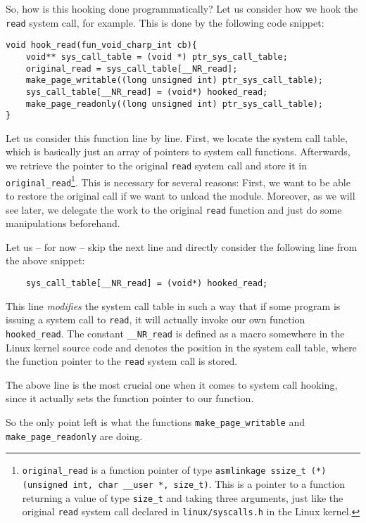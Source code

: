 \documentclass[10pt, letterpaper]{article}
\begin{document}
So, how is this hooking done programmatically? Let us consider how we hook the \texttt{read} system call, for example. This is done by the following code snippet:

\begin{verbatim}
void hook_read(fun_void_charp_int cb){
    void** sys_call_table = (void *) ptr_sys_call_table;
    original_read = sys_call_table[__NR_read];
    make_page_writable((long unsigned int) ptr_sys_call_table);
    sys_call_table[__NR_read] = (void*) hooked_read;
    make_page_readonly((long unsigned int) ptr_sys_call_table);
}
\end{verbatim}

Let us consider this function line by line. First, we locate the system call table, which is basically just an array of pointers to system call functions. Afterwards, we retrieve the pointer to the original \texttt{read} system call and store it in  \texttt{original\_read}\footnote{\texttt{original\_read} is a function pointer of type \texttt{asmlinkage ssize\_t (*)(unsigned int, char \_\_user *, size\_t)}. This is a pointer to a function returning a value of type \texttt{size\_t} and taking three arguments, just like the original \texttt{read} system call declared in \texttt{linux/syscalls.h} in the Linux kernel.}. This is necessary for several reasons: First, we want to be able to restore the original call if we want to unload the module. Moreover, as we will see later, we delegate the work to the original \texttt{read} function and just do some manipulations beforehand.

Let us -- for now -- skip the next line and directly consider the following line from the above snippet:

\begin{verbatim}
    sys_call_table[__NR_read] = (void*) hooked_read;
\end{verbatim}

This line \emph{modifies} the system call table in such a way that if some program is issuing a system call to \texttt{read}, it will actually invoke our own function \texttt{hooked\_read}. The constant \texttt{\_\_NR\_read} is defined as a macro somewhere in the Linux kernel source code and denotes the position in the system call table, where the function pointer to the \texttt{read} system call is stored.

The above line is the most crucial one when it comes to system call hooking, since it actually sets the function pointer to our function.

So the only point left is what the functions \texttt{make\_page\_writable} and \texttt{make\_page\_readonly} are doing.
\end{document}
